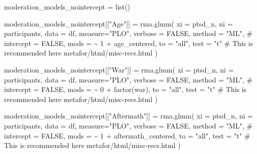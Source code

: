 \documentclass[
  letterpaper,
  DIV=11,
  numbers=noendperiod]{scrartcl}
\newenvironment{Shaded}{\begin{snugshade}}{\end{snugshade}}
\newcommand{\AttributeTok}[1]{\textcolor[rgb]{0.40,0.45,0.13}{#1}}
\newcommand{\CommentTok}[1]{\textcolor[rgb]{0.37,0.37,0.37}{#1}}
\newcommand{\ConstantTok}[1]{\textcolor[rgb]{0.56,0.35,0.01}{#1}}
\newcommand{\DecValTok}[1]{\textcolor[rgb]{0.68,0.00,0.00}{#1}}
\newcommand{\FunctionTok}[1]{\textcolor[rgb]{0.28,0.35,0.67}{#1}}
\newcommand{\NormalTok}[1]{\textcolor[rgb]{0.00,0.23,0.31}{#1}}
\newcommand{\OtherTok}[1]{\textcolor[rgb]{0.00,0.23,0.31}{#1}}
\newcommand{\SpecialCharTok}[1]{\textcolor[rgb]{0.37,0.37,0.37}{#1}}
\newcommand{\StringTok}[1]{\textcolor[rgb]{0.13,0.47,0.30}{#1}}
\begin{document}
\begin{Shaded}
\begin{Highlighting}[]
\NormalTok{moderation\_models\_nointercept }\OtherTok{=} \FunctionTok{list}\NormalTok{()}

\NormalTok{moderation\_models\_nointercept[[}\StringTok{"Age"}\NormalTok{]] }\OtherTok{=} \FunctionTok{rma.glmm}\NormalTok{(}
  \AttributeTok{xi =} \StringTok{\textasciigrave{}}\AttributeTok{ptsd\_n}\StringTok{\textasciigrave{}}\NormalTok{, }
  \AttributeTok{ni =} \StringTok{\textasciigrave{}}\AttributeTok{participants}\StringTok{\textasciigrave{}}\NormalTok{, }
  \AttributeTok{data =}\NormalTok{ df, }
  \AttributeTok{measure=}\StringTok{"PLO"}\NormalTok{,}
  \AttributeTok{verbose =} \ConstantTok{FALSE}\NormalTok{,}
  \AttributeTok{method =} \StringTok{"ML"}\NormalTok{,}
  \CommentTok{\# intercept = FALSE,}
  \AttributeTok{mods =} \SpecialCharTok{\textasciitilde{}} \DecValTok{1} \SpecialCharTok{+}\NormalTok{ age\_centered,}
  \AttributeTok{to =} \StringTok{"all"}\NormalTok{,}
  \AttributeTok{test =} \StringTok{"t"} \CommentTok{\# This is recommended here metafor/html/misc{-}recs.html}
\NormalTok{)}

\NormalTok{moderation\_models\_nointercept[[}\StringTok{"War"}\NormalTok{]] }\OtherTok{=} \FunctionTok{rma.glmm}\NormalTok{(}
  \AttributeTok{xi =} \StringTok{\textasciigrave{}}\AttributeTok{ptsd\_n}\StringTok{\textasciigrave{}}\NormalTok{, }
  \AttributeTok{ni =} \StringTok{\textasciigrave{}}\AttributeTok{participants}\StringTok{\textasciigrave{}}\NormalTok{, }
  \AttributeTok{data =}\NormalTok{ df, }
  \AttributeTok{measure=}\StringTok{"PLO"}\NormalTok{,}
  \AttributeTok{verbose =} \ConstantTok{FALSE}\NormalTok{,}
  \AttributeTok{method =} \StringTok{"ML"}\NormalTok{,}
  \CommentTok{\# intercept = FALSE,}
  \AttributeTok{mods =} \SpecialCharTok{\textasciitilde{}} \DecValTok{0} \SpecialCharTok{+} \FunctionTok{factor}\NormalTok{(war),}
  \AttributeTok{to =} \StringTok{"all"}\NormalTok{,}
  \AttributeTok{test =} \StringTok{"t"} \CommentTok{\# This is recommended here metafor/html/misc{-}recs.html}
\NormalTok{)}

\NormalTok{moderation\_models\_nointercept[[}\StringTok{"Aftermath"}\NormalTok{]] }\OtherTok{=} \FunctionTok{rma.glmm}\NormalTok{(}
  \AttributeTok{xi =} \StringTok{\textasciigrave{}}\AttributeTok{ptsd\_n}\StringTok{\textasciigrave{}}\NormalTok{, }
  \AttributeTok{ni =} \StringTok{\textasciigrave{}}\AttributeTok{participants}\StringTok{\textasciigrave{}}\NormalTok{, }
  \AttributeTok{data =}\NormalTok{ df, }
  \AttributeTok{measure=}\StringTok{"PLO"}\NormalTok{,}
  \AttributeTok{verbose =} \ConstantTok{FALSE}\NormalTok{,}
  \AttributeTok{method =} \StringTok{"ML"}\NormalTok{,}
  \CommentTok{\# intercept = FALSE,}
  \AttributeTok{mods =} \SpecialCharTok{\textasciitilde{}} \DecValTok{1} \SpecialCharTok{+}\NormalTok{ aftermath\_centered,}
  \AttributeTok{to =} \StringTok{"all"}\NormalTok{,}
  \AttributeTok{test =} \StringTok{"t"} \CommentTok{\# This is recommended here metafor/html/misc{-}recs.html}
\NormalTok{)}
\end{Highlighting}
\end{Shaded}
\end{document}

